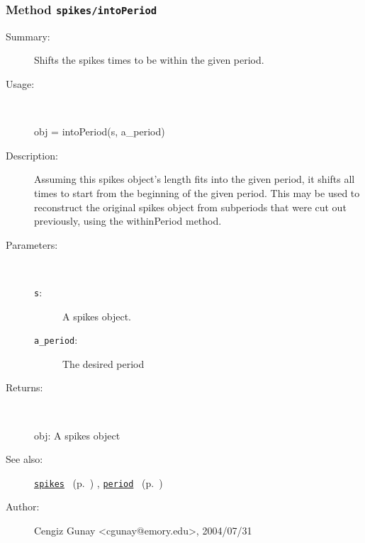 \subsubsection[Method \texttt{intoPeriod}]{Method \texttt{spikes/intoPeriod}}%
%
\label{ref_spikes__intoPeriod}%
\hypertarget{ref_spikes__intoPeriod}{}%
\begin{description}
\item[Summary:]Shifts the spikes times to be within the given period.
%
\item[Usage:]~%
\begin{lyxcode}%
obj = intoPeriod(s, a\_period)
%
\end{lyxcode}%
%
\item[Description:]%
Assuming this spikes object's length fits into the given period, it shifts
 all times to start from the beginning of the given period. This may be used
 to reconstruct the original spikes object from subperiods that were cut out
 previously, using the withinPeriod method.
\item[Parameters:]~
\begin{description}%
\item[\texttt{s}:]
 A spikes object.
\item[\texttt{a\_period}:]
 The desired period 
\end{description}%
%
\item[Returns:]~

	obj: A spikes object
%
%
\item[See also:]%
\hyperlink{ref_spikes}{\texttt{spikes}}%
\ (p.~\pageref{ref_spikes})%
%
, \hyperlink{ref_period}{\texttt{period}}%
\ (p.~\pageref{ref_period})%
%
%
\item[Author:]%
Cengiz Gunay <cgunay@emory.edu>, 2004/07/31%
\end{description}
\methodline%
